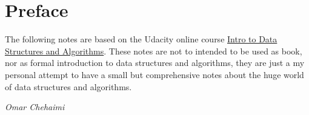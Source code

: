 \chapter*{Preface}

The following notes are based on the Udacity online course \href{https://www.udacity.com/course/data-structures-and-algorithms-in-python--ud513}{Intro to Data Structures and Algorithms}. These notes are not to intended to be used as book, nor as formal introduction to data structures and algorithms, they are just a my personal attempt to have a small but comprehensive notes about the huge world of data structures and algorithms.
 
\begin{flushright}
	\textit{Omar Chehaimi}
\end{flushright}
